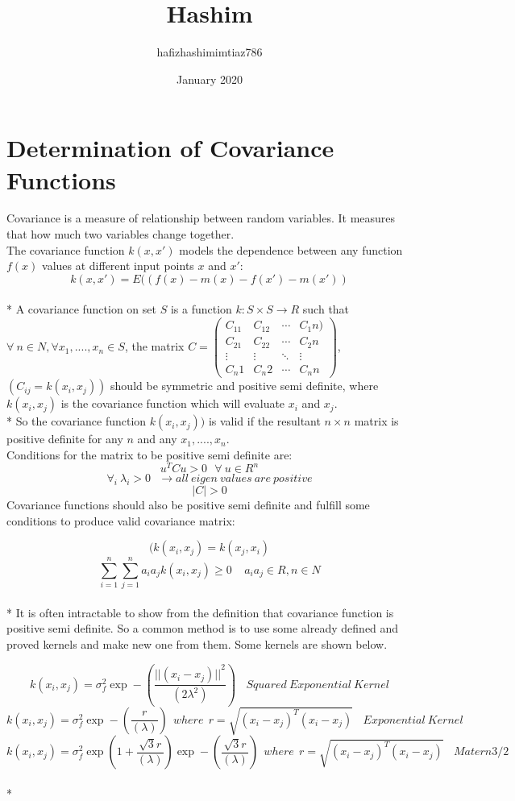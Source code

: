 \documentclass{article}
\title{Hashim}
\author{hafizhashimimtiaz786 }
\date{January 2020}
\begin{document}
\maketitle

\section{Determination of Covariance Functions}
Covariance is a measure of relationship between random variables. It measures that how much two variables change together. \\
The covariance function ${k(x,x')}$ models the dependence between any function $f(x)$ values at different input points $x$ and $x'$:
$${k(x,x')= E((f(x)-m(x)-f(x')-m(x'))}$$
\\* 
A covariance function on set $S$ is a function $k:S{\times}S\xrightarrow{}R$ such that $\forall \ n\in N, \forall x_1,....,x_n \in S$, the matrix $C = 
\begin{pmatrix}
C_11 & C_12 & \cdots & C_1n) \\
C_21 & C_22 & \cdots & C_2n\\
\vdots  & \vdots  & \ddots & \vdots  \\
C_n1 & C_n2 & \cdots & C_nn
\end{pmatrix}$,$(C_{ij} = k(x_i,x_j))$ should be symmetric and positive semi definite, where $k(x_i,x_j)$ is the covariance function which will evaluate $x_i$ and $x_j$.
\\*
So the covariance function $k(x_i,x_j))$ is valid if the resultant $n{\times}n$ matrix is positive definite for any $n$ and any $x_1,....,x_n$. \\
Conditions for the matrix to be positive semi definite are:
$${u^T}Cu > 0  \ \ \ \forall \ u\in {R^n}$$
$$ \forall_i \  \lambda_i>0 \ \ \ \xrightarrow{} all \ eigen \ values \ are \  positive$$
$$|C| > 0$$
Covariance functions should also be positive semi definite and fulfill some conditions to produce valid covariance matrix:

$$(k(x_i,x_j) = k(x_j,x_i)$$
$$\sum_{i=1}^{n} \sum_{j=1}^{n} a_i a_j k(x_i,x_j) \geq  0 \ \ \ \ \ a_i a_j\in R,n\in N$$
\\*
It is often intractable to show from the definition that covariance function is positive semi definite. So a common method is to use some already defined and proved kernels and make new one from them. Some kernels are shown below.

$$k(x_i,x_j)=\sigma_f^2 \exp-(\frac{{{||(x_i-x_j)||}^2}}{(2\lambda^2)}) \ \ \ \ Squared \ Exponential \ Kernel$$
$$k(x_i,x_j)=\sigma_f^2 \exp-(\frac{{r}}{(\lambda)}) \ \ where \ \ r = \sqrt{{(x_i-x_j)^T}{(x_i-x_j)}}\ \ \ \   Exponential \ Kernel$$
$$k(x_i,x_j)=\sigma_f^2 \exp(1 + \frac{{\sqrt{3}r}}{(\lambda)})\exp-(\frac{{\sqrt{3}r}}{(\lambda)}) \ \ where \ \ r = \sqrt{{(x_i-x_j)^T}{(x_i-x_j)}}\ \ \ \   Matern 3/2$$
\\*
\end{document}
